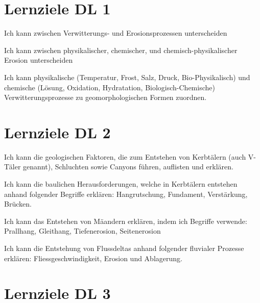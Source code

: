 \newpage

\section*{Lernziele DL 1}

\begin{todolist}
\item Ich kann zwischen Verwitterungs- und Erosionsprozessen unterscheiden
\item Ich kann zwischen physikalischer, chemischer, und chemisch-physikalischer Erosion unterscheiden
\item Ich kann physikalische (Temperatur, Frost, Salz, Druck, Bio-Physikalisch) und chemische (Lösung, Oxidation, Hydratation, Biologisch-Chemische) Verwitterungsprozesse zu geomorphologischen Formen zuordnen.
\end{todolist}

\section*{Lernziele DL 2}
\begin{todolist}
\item Ich kann die geologischen Faktoren, die zum Entstehen von Kerbtälern (auch V-Täler genannt), Schluchten sowie Canyons führen, auflisten und erklären.
\item Ich kann die baulichen Herausforderungen, welche in Kerbtälern entstehen anhand folgender Begriffe erklären:  Hangrutschung, Fundament, Verstärkung, Brücken.
\item Ich kann das Entstehen von Mäandern erklären, indem ich Begriffe verwende: Prallhang, Gleithang, Tiefenerosion, Seitenerosion
\item Ich kann die Entstehung von Flussdeltas anhand folgender fluvialer Prozesse erklären: Fliessgeschwindigkeit, Erosion und Ablagerung.
\end{todolist}
\section*{Lernziele DL 3}

